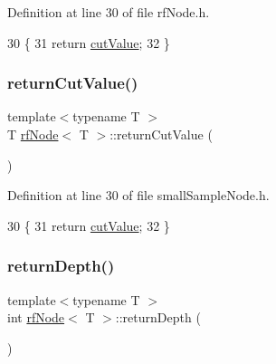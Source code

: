 Definition at line 30 of file rf\+Node.\+h.


\begin{DoxyCode}
30                                  \{
31             \textcolor{keywordflow}{return} \hyperlink{classrfNode_a49b9c55f11f1f3898eb7811f78f68796}{cutValue};
32         \}
\end{DoxyCode}
\mbox{\label{classrfNode_a8d51a6acaff3d3dca74881b55743884f}} 
\subsubsection{\texorpdfstring{return\+Cut\+Value()}{returnCutValue()}\hspace{0.1cm}{\footnotesize\ttfamily [2/2]}}
{\footnotesize\ttfamily template$<$typename T $>$ \\
T \hyperlink{classrfNode}{rf\+Node}$<$ T $>$\+::return\+Cut\+Value (\begin{DoxyParamCaption}{ }\end{DoxyParamCaption})\hspace{0.3cm}{\ttfamily [inline]}}



Definition at line 30 of file small\+Sample\+Node.\+h.


\begin{DoxyCode}
30                                  \{
31             \textcolor{keywordflow}{return} \hyperlink{classrfNode_a49b9c55f11f1f3898eb7811f78f68796}{cutValue};
32         \}
\end{DoxyCode}
\mbox{\label{classrfNode_a0e95db0d0008bf347f53343cbcd5a38e}} 
\subsubsection{\texorpdfstring{return\+Depth()}{returnDepth()}\hspace{0.1cm}{\footnotesize\ttfamily [1/2]}}
{\footnotesize\ttfamily template$<$typename T $>$ \\
int \hyperlink{classrfNode}{rf\+Node}$<$ T $>$\+::return\+Depth (\begin{DoxyParamCaption}{ }\end{DoxyParamCaption})\hspace{0.3cm}{\ttfamily [inline]}}



